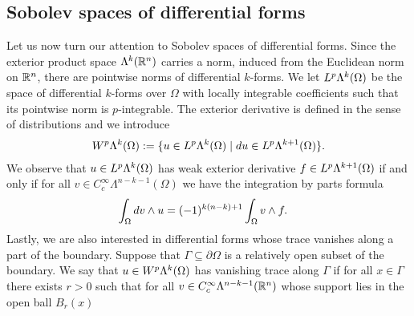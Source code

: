 \documentclass[10pt,a4paper]{article}
\newcommand{\todo}[1]{{\colorbox{yellow}{#1}}}
\newcommand\cye[1]{%
\protect\leavevmode
\begingroup
    \color{blue}%
    #1%
\endgroup
}
\newcommand{\mwl}[1]{{\color{red}#1}}
\begin{document}
\subsection{Sobolev spaces of differential forms}

Let us now turn our attention to Sobolev spaces of differential forms. 
Since the exterior product space $\Lambda^{k}({\mathbb R}^{n})$ carries a norm, induced from the Euclidean norm on ${\mathbb R}^{n}$, there are pointwise norms of differential $k$-forms. 
We let $L^{p}\Lambda^{k}(\Omega)$ be the space of differential $k$-forms over $\Omega$ with locally integrable coefficients 
such that its pointwise norm is $p$-integrable. 
The exterior derivative is defined in the sense of distributions and we introduce 
\begin{gather*}
    W^{p}\Alt^{k}(\Omega) 
    := 
    \{ u \in L^{p}\Alt^{k}(\Omega) \suchthat \cartan u \in L^{p}\Alt^{k+1}(\Omega) \}
    .
\end{gather*}
We observe that $u \in L^{p}\Lambda^{k}(\Omega)$ has weak exterior derivative $f \in L^{p}\Lambda^{k+1}(\Omega)$
if and only if for all $v \in C^{\infty}_{c}\Lambda^{n-k-1}(\Omega)$ we have the integration by parts formula
\begin{align*}
    \int_{\Omega} d v \wedge u
    &=
    (-1)^{k(n-k)+1}
    \int_{\Omega} v \wedge f 
    .
\end{align*}
Lastly, we are also interested in differential forms whose trace vanishes along a part of the boundary. 
Suppose that $\Gamma \subseteq \partial\Omega$ is a relatively open subset of the boundary. 
We say that $u \in W^{p}\Lambda^{k}(\Omega)$ has vanishing trace along $\Gamma$ if for all $x \in \Gamma$ there exists $r > 0$
such that for all $v \in C^{\infty}_{c}\Lambda^{n-k-1}({\mathbb R}^{n})$ 
whose support lies in the open ball $B_r(x)$
\end{document}
